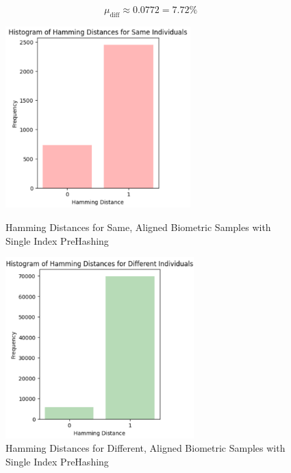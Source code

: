 \begin{enumerate}
\begin{itemize}
        \[ \mu_{\text{diff}} \approx 0.0772 = 7.72\% \]

        \begin{figure}[H]
            \centering
            \begin{minipage}[b]{0.48\linewidth}
                \centering
                \includegraphics[width=\linewidth,height=7cm,keepaspectratio]{latex-img/mu_same.png}
                \caption{Hamming Distances for Same, Aligned Biometric Samples with Single Index PreHashing}
                \label{mu_same}
            \end{minipage}
            \hfill
            \begin{minipage}[b]{0.48\linewidth}
                \centering
                \includegraphics[width=\linewidth,height=7cm,keepaspectratio]{latex-img/mu_diff.png}
                \caption{Hamming Distances for Different, Aligned Biometric Samples with Single Index PreHashing}
                \label{mu_diff}
            \end{minipage}
        \end{figure}
        
        

    \end{itemize}
\end{enumerate}

